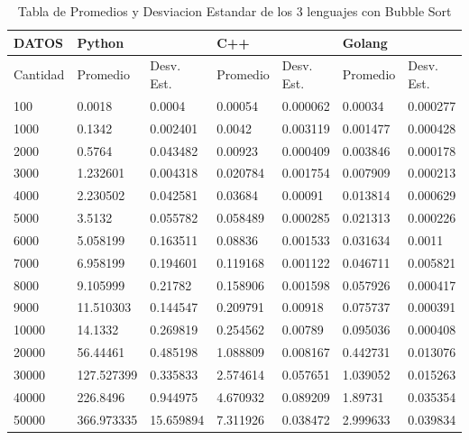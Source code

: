 \documentclass[12pt]{article} %
\begin{document}
\begin{table}[H]
    \def\arraystretch{1.3}
    \centering
    \begin{tabular}{|l|l|l|l|l|l|l|}
    \hline        
        DATOS & Python & ~ & C++ & ~ & Golang & ~ \\ \hline
        Cantidad & Promedio & Desv. Est. & Promedio & Desv. Est. & Promedio & Desv. Est. \\ \hline
        100 & 0.0018 & 0.0004 & 0.00054 & 0.000062 & 0.00034 & 0.000277 \\ \hline
        1000 & 0.1342 & 0.002401 & 0.0042 & 0.003119 & 0.001477 & 0.000428 \\ \hline
        2000 & 0.5764 & 0.043482 & 0.00923 & 0.000409 & 0.003846 & 0.000178 \\ \hline
        3000 & 1.232601 & 0.004318 & 0.020784 & 0.001754 & 0.007909 & 0.000213 \\ \hline
        4000 & 2.230502 & 0.042581 & 0.03684 & 0.00091 & 0.013814 & 0.000629 \\ \hline
        5000 & 3.5132 & 0.055782 & 0.058489 & 0.000285 & 0.021313 & 0.000226 \\ \hline
        6000 & 5.058199 & 0.163511 & 0.08836 & 0.001533 & 0.031634 & 0.0011 \\ \hline
        7000 & 6.958199 & 0.194601 & 0.119168 & 0.001122 & 0.046711 & 0.005821 \\ \hline
        8000 & 9.105999 & 0.21782 & 0.158906 & 0.001598 & 0.057926 & 0.000417 \\ \hline
        9000 & 11.510303 & 0.144547 & 0.209791 & 0.00918 & 0.075737 & 0.000391 \\ \hline
        10000 & 14.1332 & 0.269819 & 0.254562 & 0.00789 & 0.095036 & 0.000408 \\ \hline
        20000 & 56.44461 & 0.485198 & 1.088809 & 0.008167 & 0.442731 & 0.013076 \\ \hline
        30000 & 127.527399 & 0.335833 & 2.574614 & 0.057651 & 1.039052 & 0.015263 \\ \hline
        40000 & 226.8496 & 0.944975 & 4.670932 & 0.089209 & 1.89731 & 0.035354 \\ \hline
        50000 & 366.973335 & 15.659894 & 7.311926 & 0.038472 & 2.999633 & 0.039834 \\ \hline
    \end{tabular}
    \caption{Tabla de Promedios y Desviacion Estandar de los 3 lenguajes con Bubble Sort}
\end{table}

\vspace{9mm}
\end{document}
